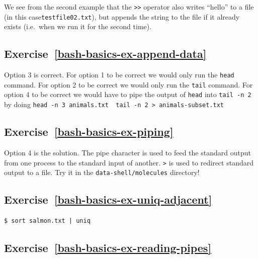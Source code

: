 \documentclass[
]{krantz}
\begin{document}
We see from the second example that the \texttt{\textgreater{}\textgreater{}} operator also writes ``hello'' to a file
(in this case\texttt{testfile02.txt}),
but appends the string to the file if it already exists (i.e.~when we run it for the second time).

\hypertarget{exercise-refbash-basics-ex-append-data}{%
\subsection*{Exercise~\ref{bash-basics-ex-append-data}}\label{exercise-refbash-basics-ex-append-data}}


Option 3 is correct.
For option 1 to be correct we would only run the \texttt{head} command.
For option 2 to be correct we would only run the \texttt{tail} command.
For option 4 to be correct we would have to pipe the output of \texttt{head} into \texttt{tail\ -n\ 2}
by doing \texttt{head\ -n\ 3\ animals.txt\ \textbar{}\ tail\ -n\ 2\ \textgreater{}\ animals-subset.txt}

\hypertarget{exercise-refbash-basics-ex-piping}{%
\subsection*{Exercise~\ref{bash-basics-ex-piping}}\label{exercise-refbash-basics-ex-piping}}


Option 4 is the solution.
The pipe character \texttt{\textbar{}} is used to feed the standard output from one process to
the standard input of another.
\texttt{\textgreater{}} is used to redirect standard output to a file.
Try it in the \texttt{data-shell/molecules} directory!

\hypertarget{exercise-refbash-basics-ex-uniq-adjacent}{%
\subsection*{Exercise~\ref{bash-basics-ex-uniq-adjacent}}\label{exercise-refbash-basics-ex-uniq-adjacent}}


\begin{verbatim}
$ sort salmon.txt | uniq
\end{verbatim}

\hypertarget{exercise-refbash-basics-ex-reading-pipes}{%
\subsection*{Exercise~\ref{bash-basics-ex-reading-pipes}}\label{exercise-refbash-basics-ex-reading-pipes}}
\end{document}
